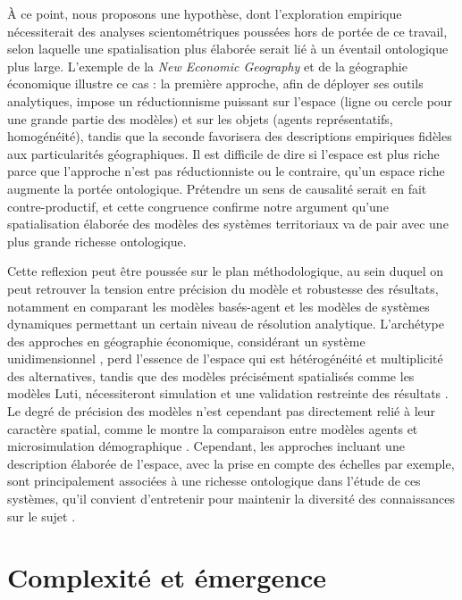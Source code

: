 \documentclass[11pt]{article}
\begin{document}
À ce point, nous proposons une hypothèse, dont l'exploration empirique nécessiterait des analyses scientométriques poussées hors de portée de ce travail, selon laquelle une spatialisation plus élaborée serait lié à un éventail ontologique plus large. L'exemple de la \emph{New Economic Geography} et de la géographie économique illustre ce cas \citep{marchionni2004geographical}: la première approche, afin de déployer ses outils analytiques, impose un réductionnisme puissant sur l'espace (ligne ou cercle pour une grande partie des modèles) et sur les objets (agents représentatifs, homogénéité), tandis que la seconde favorisera des descriptions empiriques fidèles aux particularités géographiques. Il est difficile de dire si l'espace est plus riche parce que l'approche n'est pas réductionniste ou le contraire, qu'un espace riche augmente la portée ontologique. Prétendre un sens de causalité serait en fait contre-productif, et cette congruence confirme notre argument qu'une spatialisation élaborée des modèles des systèmes territoriaux va de pair avec une plus grande richesse ontologique.

Cette reflexion peut être poussée sur le plan méthodologique, au sein duquel on peut retrouver la tension entre précision du modèle et robustesse des résultats, notamment en comparant les modèles basés-agent et les modèles de systèmes dynamiques permettant un certain niveau de résolution analytique. L'archétype des approches en géographie économique, considérant un système unidimensionnel \citep{krugman1992dynamic}, perd l'essence de l'espace qui est hétérogénéité et multiplicité des alternatives, tandis que des modèles précisément spatialisés comme les modèles Luti, nécessiteront simulation et une validation restreinte des résultats \citep{bonnel2014survey}. Le degré de précision des modèles n'est cependant pas directement relié à leur caractère spatial, comme le montre la comparaison entre modèles agents et microsimulation démographique \citep{birkin2011spatial}. Cependant, les approches incluant une description élaborée de l'espace, avec la prise en compte des échelles par exemple, sont principalement associées à une richesse ontologique dans l'étude de ces systèmes, qu'il convient d'entretenir pour maintenir la diversité des connaissances sur le sujet \citep{sanders2018survival}.


\section{Complexité et émergence}
\end{document}
